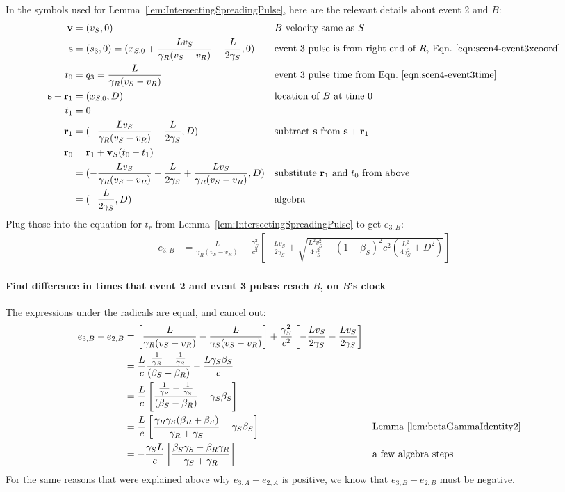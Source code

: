 \documentclass[a4paper]{article}
\theoremstyle{plain}
\theoremstyle{definition}
\newcommand{\vect}[1]{\mathbf{#1}}
\begin{document}
In the symbols used for Lemma~\ref{lem:IntersectingSpreadingPulse},
here are the relevant details about event 2 and $B$:
\begin{align*}
\vect{v} & = (v_S, 0) & & \text{$B$ velocity same as $S$} \\
\vect{s} & = (s_3,0) = (x_{S,0} + \frac{Lv_S}{\gamma_R(v_S - v_R)} + \frac{L}{2\gamma_S}, 0) & & \text{event 3 pulse is from right end of $R$, Eqn.~\eqref{eqn:scen4-event3xcoord}} \\
t_0 & = q_3 = \frac{L}{\gamma_R(v_S - v_R)} & & \text{event 3 pulse time from Eqn.~\eqref{eqn:scen4-event3time}} \\
\vect{s} + \vect{r}_1 & = (x_{S,0}, D) & & \text{location of $B$ at time 0} \\
t_1 & = 0 \\
\vect{r}_1 & = (-\frac{Lv_S}{\gamma_R(v_S - v_R)} - \frac{L}{2\gamma_S}, D) & & \text{subtract $\vect{s}$ from $\vect{s}+\vect{r}_1$} \\
\vect{r}_0
  & = \vect{r}_1 + \vect{v}_S(t_0-t_1) \\
  & = (-\frac{Lv_S}{\gamma_R(v_S - v_R)} - \frac{L}{2\gamma_S} + \frac{Lv_S}{\gamma_R(v_S - v_R)}, D) & & \text{substitute $\vect{r}_1$ and $t_0$ from above} \\
  & = (-\frac{L}{2\gamma_S}, D) & & \text{algebra}
\end{align*}
Plug those into the equation for $t_r$ from
Lemma~\ref{lem:IntersectingSpreadingPulse} to get $e_{3,B}$:
\begin{align*}
e_{3,B} & = \frac{L}{\gamma_R(v_S - v_R)} + \frac{\gamma_S^2}{c^2} \left[ -\frac{Lv_S}{2\gamma_S} + \sqrt{\frac{L^2v_S^2}{4\gamma_S^2} + (1-\beta_S)^2c^2 (\frac{L^2}{4\gamma_S^2} + D^2)} \right]
\end{align*}


\paragraph{Find difference in times that event 2 and event 3 pulses reach $B$, on $B$'s clock}

The expressions under the radicals are equal, and cancel out:
\begin{align*}
e_{3,B}-e_{2,B}
  & = \left[ \frac{L}{\gamma_R(v_S - v_R)} - \frac{L}{\gamma_S(v_S - v_R)} \right] + \frac{\gamma_S^2}{c^2} \left[ -\frac{Lv_S}{2\gamma_S} - \frac{Lv_S}{2\gamma_S} \right] \\
  & = \frac{L}{c} \frac{\frac{1}{\gamma_R} - \frac{1}{\gamma_S}}{(\beta_S - \beta_R)} - \frac{L\gamma_S\beta_S}{c} \\
  & = \frac{L}{c} \left[ \frac{\frac{1}{\gamma_R} - \frac{1}{\gamma_S}}{(\beta_S - \beta_R)} - \gamma_S\beta_S \right] \\
  & = \frac{L}{c} \left[ \frac{\gamma_R\gamma_S(\beta_R+\beta_S)}{\gamma_R+\gamma_S} - \gamma_S\beta_S \right] & & \text{Lemma~\ref{lem:betaGammaIdentity2}} \\
  & = -\frac{\gamma_S L}{c} \left[ \frac{\beta_S\gamma_S - \beta_R\gamma_R}{\gamma_S + \gamma_R} \right] & & \text{a few algebra steps}
\end{align*}
For the same reasons that were explained above why $e_{3,A}-e_{2,A}$
is positive, we know that $e_{3,B}-e_{2,B}$ must be negative.
\end{document}
